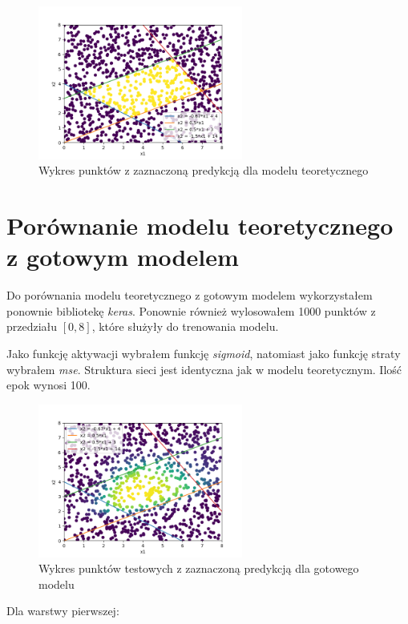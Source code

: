 \documentclass{article}
\begin{document}
\begin{figure}[H]
    \centering
    \includegraphics[width=0.6\textwidth]{punkty_teor.png}
    \caption{Wykres punktów z zaznaczoną predykcją dla modelu teoretycznego}
\end{figure}

\section{Porównanie modelu teoretycznego z gotowym modelem}

Do porównania modelu teoretycznego z gotowym modelem wykorzystałem
ponownie bibliotekę \textit{keras}. Ponownie również wylosowałem
1000 punktów z przedziału $[0, 8]$, które służyły do trenowania modelu.

Jako funkcję aktywacji wybrałem funkcję \textit{sigmoid}, natomiast
jako funkcję straty wybrałem \textit{mse}. Struktura sieci jest identyczna
jak w modelu teoretycznym. Ilość epok wynosi 100.

\begin{figure}[H]
    \centering
    \includegraphics[width=0.6\textwidth]{punkty.png}
    \caption{Wykres punktów testowych z zaznaczoną predykcją dla gotowego modelu}
\end{figure}


Dla warstwy pierwszej:
\end{document}
